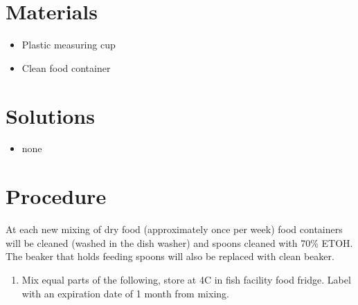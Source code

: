 \documentclass[
  letterpaper,
  DIV=11,
  numbers=noendperiod]{scrreprt}
\providecommand{\tightlist}{%
  \setlength{\itemsep}{0pt}\setlength{\parskip}{0pt}}\usepackage{longtable,booktabs,array}
\begin{document}
\hypertarget{materials-49}{%
\section{Materials}\label{materials-49}}

\begin{itemize}
\tightlist
\item
  Plastic measuring cup
\item
  Clean food container
\end{itemize}

\hypertarget{solutions-40}{%
\section{Solutions}\label{solutions-40}}

\begin{itemize}
\tightlist
\item
  none
\end{itemize}

\hypertarget{procedure-49}{%
\section{Procedure}\label{procedure-49}}

\begin{tcolorbox}[enhanced jigsaw, rightrule=.15mm, title=\textcolor{quarto-callout-warning-color}{\faExclamationTriangle}\hspace{0.5em}{NOTES}, titlerule=0mm, opacitybacktitle=0.6, toprule=.15mm, bottomrule=.15mm, opacityback=0, left=2mm, colframe=quarto-callout-warning-color-frame, breakable, coltitle=black, colback=white, colbacktitle=quarto-callout-warning-color!10!white, bottomtitle=1mm, leftrule=.75mm, toptitle=1mm, arc=.35mm]

At each new mixing of dry food (approximately once per week) food
containers will be cleaned (washed in the dish washer) and spoons
cleaned with 70\% ETOH. The beaker that holds feeding spoons will also
be replaced with clean beaker.

\end{tcolorbox}

\begin{enumerate}
\def\labelenumi{\arabic{enumi}.}
\tightlist
\item
  Mix equal parts of the following, store at 4C in fish facility food
  fridge. Label with an expiration date of 1 month from mixing.
\end{enumerate}
\end{document}
